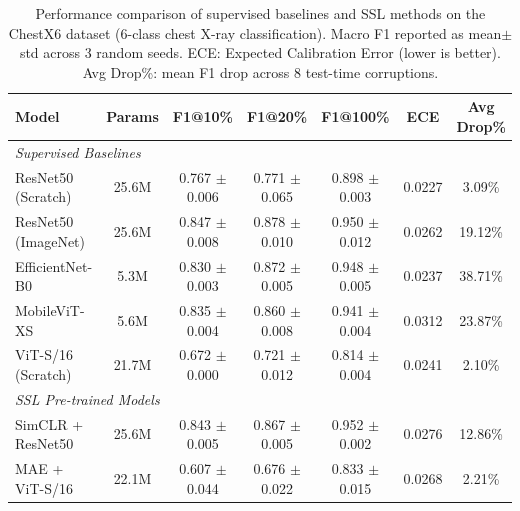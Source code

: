 \begin{table}[ht]
\centering
\caption{Performance comparison of supervised baselines and SSL methods
on the ChestX6 dataset (6-class chest X-ray classification).
Macro F1 reported as mean$\pm$std across 3 random seeds.
ECE: Expected Calibration Error (lower is better).
Avg Drop\%: mean F1 drop across 8 test-time corruptions.}
\label{tab:main_results}
\begin{tabular}{lcccccc}
\toprule
Model & Params & F1@10\% & F1@20\% & F1@100\% & ECE & Avg Drop\% \\
\midrule
\multicolumn{7}{l}{\textit{Supervised Baselines}} \\
ResNet50 (Scratch) & 25.6M & 0.767 $\pm$ 0.006 & 0.771 $\pm$ 0.065 & 0.898 $\pm$ 0.003 & 0.0227 & 3.09\% \\
ResNet50 (ImageNet) & 25.6M & 0.847 $\pm$ 0.008 & 0.878 $\pm$ 0.010 & 0.950 $\pm$ 0.012 & 0.0262 & 19.12\% \\
EfficientNet-B0 & 5.3M & 0.830 $\pm$ 0.003 & 0.872 $\pm$ 0.005 & 0.948 $\pm$ 0.005 & 0.0237 & 38.71\% \\
MobileViT-XS & 5.6M & 0.835 $\pm$ 0.004 & 0.860 $\pm$ 0.008 & 0.941 $\pm$ 0.004 & 0.0312 & 23.87\% \\
ViT-S/16 (Scratch) & 21.7M & 0.672 $\pm$ 0.000 & 0.721 $\pm$ 0.012 & 0.814 $\pm$ 0.004 & 0.0241 & 2.10\% \\
\midrule
\multicolumn{7}{l}{\textit{SSL Pre-trained Models}} \\
SimCLR + ResNet50 & 25.6M & 0.843 $\pm$ 0.005 & 0.867 $\pm$ 0.005 & 0.952 $\pm$ 0.002 & 0.0276 & 12.86\% \\
MAE + ViT-S/16 & 22.1M & 0.607 $\pm$ 0.044 & 0.676 $\pm$ 0.022 & 0.833 $\pm$ 0.015 & 0.0268 & 2.21\% \\
\bottomrule
\end{tabular}
\end{table}